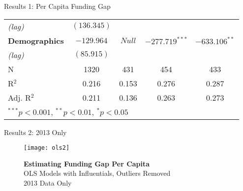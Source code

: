 \documentclass{beamer}
\begin{document}
\begin{frame}{\textmd{Results 1: Per Capita Funding Gap}}
\begin{table}
\begin{tiny}
\begin{center}
\begin{tabular}{l c c c c }
\hspace*{0.25cm} \emph{(lag)} & $(136.345)$       &        &  &       \\[0.4ex]
\textbf{Demographics} & $-129.964$        & \color{gray}$Null$       & $-277.719^{***}$ & $-633.106^{**}$   \\
\hspace*{0.25cm} \emph{(lag)}&    $(85.915)$     &        &  &      \\[0.2ex]
\hline
N           & 1320              & 431               & 454              & 433                \\
R$^2$               & 0.216             & 0.153             & 0.276            & 0.287              \\
Adj. R$^2$          & 0.211             & 0.136             & 0.263            & 0.273              \\
\hline
\multicolumn{5}{l}{$^{***}p<0.001$, $^{**}p<0.01$, $^*p<0.05$}\\
\end{tabular}
\end{center}
\end{tiny}
\end{table}
\end{frame}

\begin{frame}{\textmd{Results 2: 2013 Only}}
	 \begin{figure}
\caption*{\textbf{Estimating Funding Gap Per Capita}\\ \tiny{OLS Models with Influentials, Outliers Removed\\2013 Data Only}} 
            \texttt{[image: ols2]}
      \end{figure}
\end{frame}
\end{document}
